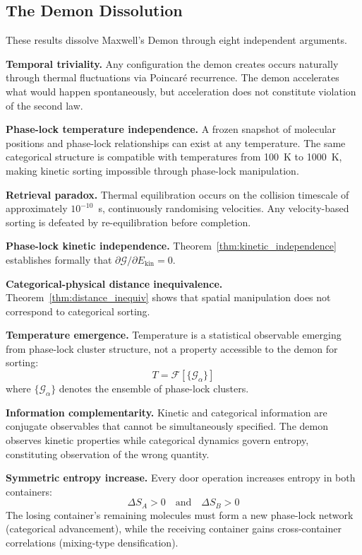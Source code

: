 \documentclass[twocolumn,10pt,a4paper]{article}
\theoremstyle{definition}
\theoremstyle{remark}
\newcommand{\phaselockgraph}{\mathcal{G}}
\begin{document}
\subsection{The Demon Dissolution}

These results dissolve Maxwell's Demon through eight independent arguments.

\textbf{Temporal triviality.} Any configuration the demon creates occurs naturally through thermal fluctuations via Poincaré recurrence. The demon accelerates what would happen spontaneously, but acceleration does not constitute violation of the second law.

\textbf{Phase-lock temperature independence.} A frozen snapshot of molecular positions and phase-lock relationships can exist at any temperature. The same categorical structure is compatible with temperatures from 100~K to 1000~K, making kinetic sorting impossible through phase-lock manipulation.

\textbf{Retrieval paradox.} Thermal equilibration occurs on the collision timescale of approximately $10^{-10}$~s, continuously randomising velocities. Any velocity-based sorting is defeated by re-equilibration before completion.

\textbf{Phase-lock kinetic independence.} Theorem~\ref{thm:kinetic_independence} establishes formally that $\partial \phaselockgraph/\partial E_{\mathrm{kin}} = 0$.

\textbf{Categorical-physical distance inequivalence.} Theorem~\ref{thm:distance_inequiv} shows that spatial manipulation does not correspond to categorical sorting.

\textbf{Temperature emergence.} Temperature is a statistical observable emerging from phase-lock cluster structure, not a property accessible to the demon for sorting:
\begin{equation}
T = \mathcal{F}[\{\phaselockgraph_\alpha\}]
\end{equation}
where $\{\phaselockgraph_\alpha\}$ denotes the ensemble of phase-lock clusters.

\textbf{Information complementarity.} Kinetic and categorical information are conjugate observables that cannot be simultaneously specified. The demon observes kinetic properties while categorical dynamics govern entropy, constituting observation of the wrong quantity.

\textbf{Symmetric entropy increase.} Every door operation increases entropy in both containers:
\begin{equation}
\Delta S_A > 0 \quad \text{and} \quad \Delta S_B > 0
\end{equation}
The losing container's remaining molecules must form a new phase-lock network (categorical advancement), while the receiving container gains cross-container correlations (mixing-type densification).
\end{document}

